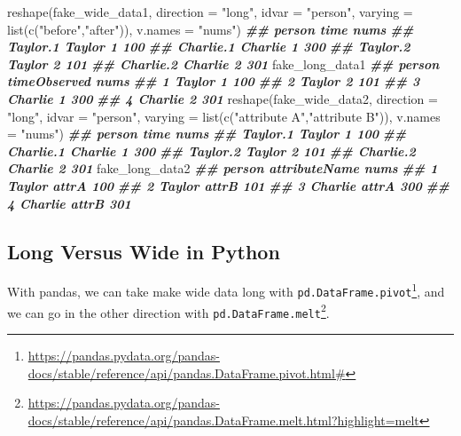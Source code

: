 \documentclass[
  12pt,
]{krantz}
\makeatletter
\newenvironment{Shaded}{\begin{snugshade}}{\end{snugshade}}
\newcommand{\AttributeTok}[1]{\textcolor[rgb]{0.61,0.61,0.61}{#1}}
\newcommand{\DocumentationTok}[1]{\textcolor[rgb]{0.37,0.37,0.37}{\textbf{\textit{#1}}}}
\newcommand{\FunctionTok}[1]{\textcolor[rgb]{0,0,0}{#1}}
\newcommand{\NormalTok}[1]{#1}
\newcommand{\StringTok}[1]{\textcolor[rgb]{0.5,0.5,0.5}{#1}}
\renewcommand{\href}[2]{#2\footnote{\url{#1}}}
\newenvironment{kframe}{%
\medskip{}
\setlength{\fboxsep}{.8em}
 \def\at@end@of@kframe{}%
 \ifinner\ifhmode%
  \def\at@end@of@kframe{\end{minipage}}%
  \begin{minipage}{\columnwidth}%
 \fi\fi%
 \def\FrameCommand##1{\hskip\@totalleftmargin \hskip-\fboxsep
 \colorbox{shadecolor}{##1}\hskip-\fboxsep
     \hskip-\linewidth \hskip-\@totalleftmargin \hskip\columnwidth}%
 \MakeFramed {\advance\hsize-\width
   \@totalleftmargin\z@ \linewidth\hsize
   \@setminipage}}%
 {\par\unskip\endMakeFramed%
 \at@end@of@kframe}
\renewenvironment{Shaded}{\begin{kframe}}{\end{kframe}}
\makeatother
\begin{document}
\begin{Shaded}
\begin{Highlighting}[]
\FunctionTok{reshape}\NormalTok{(fake\_wide\_data1, }
        \AttributeTok{direction =} \StringTok{"long"}\NormalTok{,}
        \AttributeTok{idvar =} \StringTok{"person"}\NormalTok{, }
        \AttributeTok{varying =} \FunctionTok{list}\NormalTok{(}\FunctionTok{c}\NormalTok{(}\StringTok{"before"}\NormalTok{,}\StringTok{"after"}\NormalTok{)),}
        \AttributeTok{v.names =} \StringTok{"nums"}\NormalTok{)}
\DocumentationTok{\#\#            person time nums}
\DocumentationTok{\#\# Taylor.1   Taylor    1  100}
\DocumentationTok{\#\# Charlie.1 Charlie    1  300}
\DocumentationTok{\#\# Taylor.2   Taylor    2  101}
\DocumentationTok{\#\# Charlie.2 Charlie    2  301}
\NormalTok{fake\_long\_data1}
\DocumentationTok{\#\#    person timeObserved nums}
\DocumentationTok{\#\# 1  Taylor            1  100}
\DocumentationTok{\#\# 2  Taylor            2  101}
\DocumentationTok{\#\# 3 Charlie            1  300}
\DocumentationTok{\#\# 4 Charlie            2  301}
\FunctionTok{reshape}\NormalTok{(fake\_wide\_data2, }
        \AttributeTok{direction =} \StringTok{"long"}\NormalTok{,}
        \AttributeTok{idvar =} \StringTok{"person"}\NormalTok{, }
        \AttributeTok{varying =} \FunctionTok{list}\NormalTok{(}\FunctionTok{c}\NormalTok{(}\StringTok{"attribute A"}\NormalTok{,}\StringTok{"attribute B"}\NormalTok{)),}
        \AttributeTok{v.names =} \StringTok{"nums"}\NormalTok{)}
\DocumentationTok{\#\#            person time nums}
\DocumentationTok{\#\# Taylor.1   Taylor    1  100}
\DocumentationTok{\#\# Charlie.1 Charlie    1  300}
\DocumentationTok{\#\# Taylor.2   Taylor    2  101}
\DocumentationTok{\#\# Charlie.2 Charlie    2  301}
\NormalTok{fake\_long\_data2}
\DocumentationTok{\#\#    person attributeName nums}
\DocumentationTok{\#\# 1  Taylor         attrA  100}
\DocumentationTok{\#\# 2  Taylor         attrB  101}
\DocumentationTok{\#\# 3 Charlie         attrA  300}
\DocumentationTok{\#\# 4 Charlie         attrB  301}
\end{Highlighting}
\end{Shaded}

\hypertarget{long-versus-wide-in-python}{%
\subsection{Long Versus Wide in Python}\label{long-versus-wide-in-python}}

With pandas, we can take make wide data long with \href{https://pandas.pydata.org/pandas-docs/stable/reference/api/pandas.DataFrame.pivot.html\#}{\texttt{pd.DataFrame.pivot}}, and we can go in the other direction with \href{https://pandas.pydata.org/pandas-docs/stable/reference/api/pandas.DataFrame.melt.html?highlight=melt}{\texttt{pd.DataFrame.melt}}.
\end{document}
